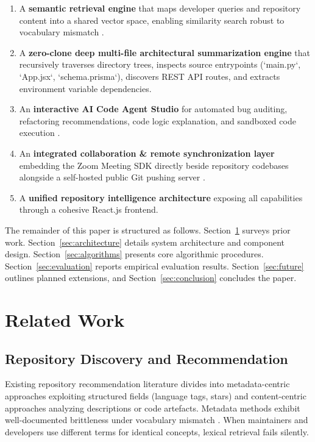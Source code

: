 \documentclass[journal]{IEEEtran}
\begin{document}
\begin{enumerate}
    \item A \textbf{semantic retrieval engine} that maps developer queries and repository content into a shared vector space, enabling similarity search robust to vocabulary mismatch \cite{devlin2019bert, reimers2019sbert}.
    \item A \textbf{zero-clone deep multi-file architectural summarization engine} that recursively traverses directory trees, inspects source entrypoints (`main.py`, `App.jsx`, `schema.prisma`), discovers REST API routes, and extracts environment variable dependencies.
    \item An \textbf{interactive AI Code Agent Studio} for automated bug auditing, refactoring recommendations, code logic explanation, and sandboxed code execution \cite{openai_gpt4}.
    \item An \textbf{integrated collaboration & remote synchronization layer} embedding the Zoom Meeting SDK directly beside repository codebases alongside a self-hosted public Git pushing server \cite{zoom_sdk}.
    \item A \textbf{unified repository intelligence architecture} exposing all capabilities through a cohesive React.js frontend.
\end{enumerate}

The remainder of this paper is structured as follows. Section~\ref{sec:related} surveys prior work. Section~\ref{sec:architecture} details system architecture and component design. Section~\ref{sec:algorithms} presents core algorithmic procedures. Section~\ref{sec:evaluation} reports empirical evaluation results. Section~\ref{sec:future} outlines planned extensions, and Section~\ref{sec:conclusion} concludes the paper.

\section{Related Work}
\label{sec:related}

\subsection{Repository Discovery and Recommendation}

Existing repository recommendation literature divides into metadata-centric approaches exploiting structured fields (language tags, stars) and content-centric approaches analyzing descriptions or code artefacts. Metadata methods exhibit well-documented brittleness under vocabulary mismatch \cite{dang2024legion}. When maintainers and developers use different terms for identical concepts, lexical retrieval fails silently.
\end{document}
